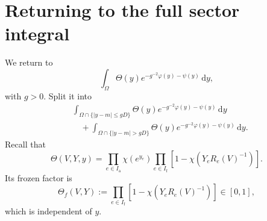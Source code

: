 \documentclass[10pt,reqno]{amsart}
\theoremstyle{definition}
\theoremstyle{remark}
\numberwithin{equation}{section}
\numberwithin{figure}{section}
\newcommand{\dd}{\mathrm d}
\newcommand{\Ia}{I_{\mathrm a}}
\newcommand{\If}{I_{\mathrm f}}
\begin{document}
\section{Returning to the full sector integral}\label{sec:sector-tail}
We return to
\begin{equation}\label{eq:sector-integral-return}
\int_\Omega\Theta(y)e^{-g^{-2}\varphi(y)-\psi(y)}\,\dd y,
\end{equation}
with $g>0$. Split it into
\begin{equation}\label{eq:central-tail-splitting}
\begin{aligned}
&\int_{\Omega\cap\{|y-m|\le gD\}}
\Theta(y)e^{-g^{-2}\varphi(y)-\psi(y)}\,\dd y\\
&\quad+\int_{\Omega\cap\{|y-m|>gD\}}
\Theta(y)e^{-g^{-2}\varphi(y)-\psi(y)}\,\dd y.
\end{aligned}
\end{equation}
Recall that
\begin{equation}\label{eq:cutoff-recalled}
\Theta(V,Y,y)=\prod_{e\in\Ia}\chi(e^{y_e})
\prod_{e\in\If}\left[1-\chi(Y_eR_e(V)^{-1})\right].
\end{equation}
Its frozen factor is
\begin{equation}\label{eq:frozen-cutoff}
\Theta_f(V,Y):=\prod_{e\in\If}
\left[1-\chi(Y_eR_e(V)^{-1})\right]\in[0,1],
\end{equation}
which is independent of $y$.
\end{document}
